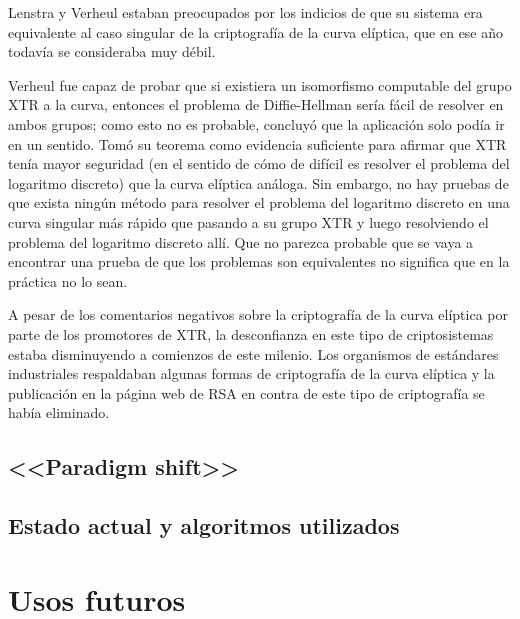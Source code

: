 \documentclass[
  a4paper,
  12pt,
  spanish,
]{scrartcl}
\begin{document}
Lenstra y Verheul estaban preocupados por los indicios de que su sistema era equivalente al caso singular de la criptografía de la curva elíptica, que en ese año todavía se consideraba muy débil.

Verheul fue capaz de probar que si existiera un isomorfismo computable del grupo XTR a la curva, entonces el problema de Diffie-Hellman sería fácil de resolver en ambos grupos; como esto no es probable, concluyó que la aplicación solo podía ir en un sentido. Tomó su teorema como evidencia suficiente para afirmar que XTR tenía mayor seguridad (en el sentido de cómo de difícil es resolver el problema del logaritmo discreto) que la curva elíptica análoga. Sin embargo, no hay pruebas de que exista ningún método para resolver el problema del logaritmo discreto  en una curva singular más rápido que pasando a su grupo XTR y luego resolviendo el problema del logaritmo discreto allí. Que no parezca probable que se vaya a encontrar una prueba de que los problemas son equivalentes no significa que en la práctica no lo sean.

A pesar de los comentarios negativos sobre la criptografía de la curva elíptica por parte de los promotores de XTR, la desconfianza en este tipo de criptosistemas estaba disminuyendo a comienzos de este milenio. Los organismos de estándares industriales respaldaban algunas formas de criptografía de la curva elíptica y la publicación en la página web de RSA en contra de este tipo de criptografía se había eliminado.

\subsection{<<Paradigm shift>>}



\subsection{Estado actual y algoritmos utilizados}


\section{Usos futuros}




\newpage
\printbibliography
\end{document}
